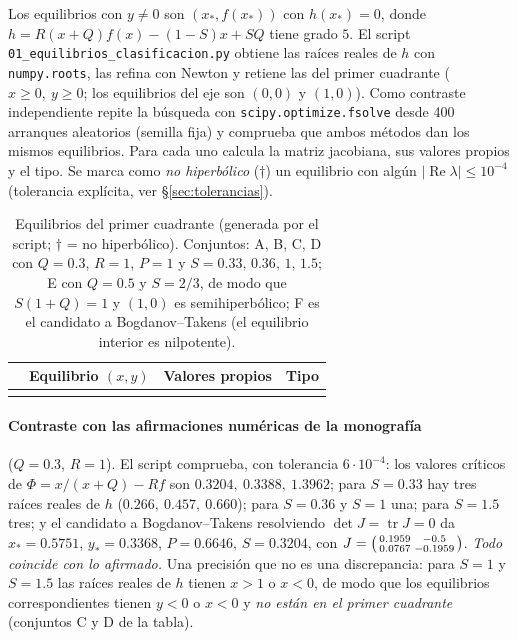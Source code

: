 \documentclass[11pt,a4paper]{article}
\newcommand{\tr}{\operatorname{tr}}
\theoremstyle{plain}
\theoremstyle{definition}
\theoremstyle{remark}
\begin{document}
Los equilibrios con $y\ne0$ son $(x_*,f(x_*))$ con $h(x_*)=0$, donde $h=R(x+Q)f(x)-(1-S)x+SQ$ tiene grado $5$. El script \texttt{01\_equilibrios\_clasificacion.py} obtiene las raíces reales de $h$ con \texttt{numpy.roots}, las refina con Newton y retiene las del primer cuadrante ($x\ge0,\ y\ge0$; los equilibrios del eje son $(0,0)$ y $(1,0)$). Como contraste independiente repite la búsqueda con \texttt{scipy.optimize.fsolve} desde 400 arranques aleatorios (semilla fija) y comprueba que ambos métodos dan los mismos equilibrios. Para cada uno calcula la matriz jacobiana, sus valores propios y el tipo. Se marca como \emph{no hiperbólico} ($\dagger$) un equilibrio con algún $|\operatorname{Re}\lambda|\le10^{-4}$ (tolerancia explícita, ver \S\ref{sec:tolerancias}).

\begin{table}[ht]
\centering
\small
\begin{tabular}{@{}l l l l@{}}
\toprule
 & Equilibrio $(x,y)$ & Valores propios & Tipo \\
\midrule
 \\
\bottomrule
\end{tabular}
\caption{Equilibrios del primer cuadrante (generada por el script; $\dagger$ = no hiperbólico). Conjuntos: A, B, C, D con $Q=0.3$, $R=1$, $P=1$ y $S=0.33,\,0.36,\,1,\,1.5$; E con $Q=0.5$ y $S=2/3$, de modo que $S(1+Q)=1$ y $(1,0)$ es semihiperbólico; F es el candidato a Bogdanov--Takens (el equilibrio interior es nilpotente).}
\label{tab:equilibrios}
\end{table}

\paragraph{Contraste con las afirmaciones numéricas de la monografía} ($Q=0.3$, $R=1$). El script comprueba, con tolerancia $6\cdot10^{-4}$: los valores críticos de $\Phi=x/(x+Q)-Rf$ son $0.3204,\ 0.3388,\ 1.3962$; para $S=0.33$ hay tres raíces reales de $h$ ($0.266,\ 0.457,\ 0.660$); para $S=0.36$ y $S=1$ una; para $S=1.5$ tres; y el candidato a Bogdanov--Takens resolviendo $\det J=\tr J=0$ da $x_*=0.5751$, $y_*=0.3368$, $P=0.6646$, $S=0.3204$, con $J=\begin{psmallmatrix}0.1959&-0.5\\0.0767&-0.1959\end{psmallmatrix}$. \emph{Todo coincide con lo afirmado.} Una precisión que no es una discrepancia: para $S=1$ y $S=1.5$ las raíces reales de $h$ tienen $x>1$ o $x<0$, de modo que los equilibrios correspondientes tienen $y<0$ o $x<0$ y \emph{no están en el primer cuadrante} (conjuntos C y D de la tabla).
\end{document}
